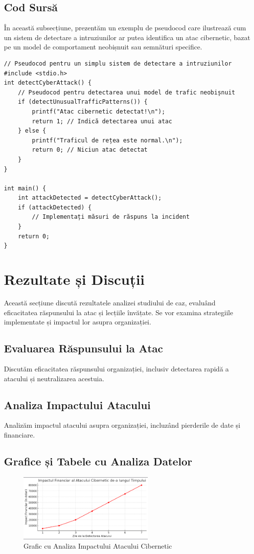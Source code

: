 \documentclass[12pt]{article}
\begin{document}
\subsection{Cod Sursă}
În această subsecțiune, prezentăm un exemplu de pseudocod care ilustrează cum un sistem de detectare a intruziunilor ar putea identifica un atac cibernetic, bazat pe un model de comportament neobișnuit sau semnături specifice.

\begin{verbatim}
// Pseudocod pentru un simplu sistem de detectare a intruziunilor
#include <stdio.h>
int detectCyberAttack() {
    // Pseudocod pentru detectarea unui model de trafic neobișnuit
    if (detectUnusualTrafficPatterns()) {
        printf("Atac cibernetic detectat!\n");
        return 1; // Indică detectarea unui atac
    } else {
        printf("Traficul de rețea este normal.\n");
        return 0; // Niciun atac detectat
    }
}

int main() {
    int attackDetected = detectCyberAttack();
    if (attackDetected) {
        // Implementați măsuri de răspuns la incident
    }
    return 0;
}
\end{verbatim}


\newpage
\section{Rezultate și Discuții}
Această secțiune discută rezultatele analizei studiului de caz, evaluând eficacitatea răspunsului la atac și lecțiile învățate. Se vor examina strategiile implementate și impactul lor asupra organizației.

\subsection{Evaluarea Răspunsului la Atac}
Discutăm eficacitatea răspunsului organizației, inclusiv detectarea rapidă a atacului și neutralizarea acestuia.

\subsection{Analiza Impactului Atacului}
Analizăm impactul atacului asupra organizației, incluzând pierderile de date și financiare.

\subsection{Grafice și Tabele cu Analiza Datelor}
\begin{figure}[h]
\centering
\includegraphics[width=0.6\textwidth]{poze/grafic cap4.png}
\caption{Grafic cu Analiza Impactului Atacului Cibernetic}
\end{figure}
\end{document}
